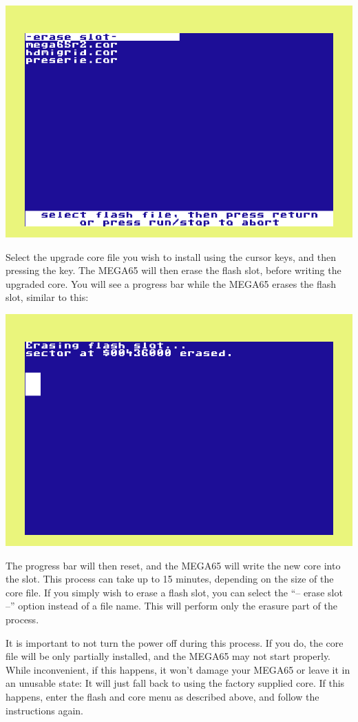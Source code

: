 \includegraphics[width=\linewidth]{images/ss-flashmenu-selectcore.png}

Select the upgrade core file you wish to
install using the cursor keys, and then pressing the  key.  The MEGA65 will then erase
the flash slot, before writing the upgraded core.  You will see a progress bar while the MEGA65 erases
the flash slot, similar to this:

\includegraphics[width=\linewidth]{images/ss-flashmenu-erasing.png}

The progress bar will then reset, and the MEGA65 will
write the new core into the slot. This process can take up to 15
minutes, depending on the size of the core file.  If you simply wish
to erase a flash slot, you can select the 
``-- erase slot --'' option instead of a file name. This will perform
only the erasure part of the process. 

It is important to not turn the power off during this process. If you do, the core file will be
only partially installed, and the MEGA65 may not start properly. 
While
inconvenient, if this happens, it won't damage your MEGA65 or leave it
in an unusable state: It will just fall back to using the factory
supplied core.
If this happens, enter the flash and core
menu as described above, and follow the instructions again.

